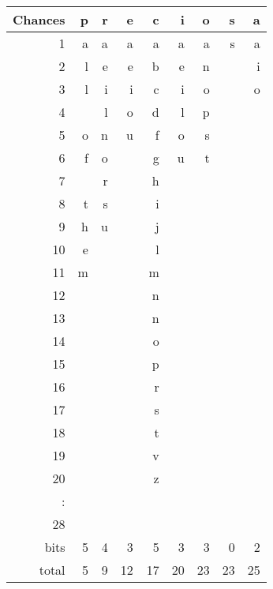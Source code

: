 \begin{tabular}{r|rrrrrrrr}
    Chances & p & r & e & c & i & o & s & a\\
    \hline
     1 & a & a & a & a & a & a & s & a\\
     2 & l & e & e & b & e & n &   & i\\
     3 & l & i & i & c & i & o &   & o\\
     4 &   & l & o & d & l & p &   &\\
     5 & o & n & u & f & o & s &   &\\
     6 & f & o &   & g & u & t &   &\\
     7 &   & r &   & h &   &   &   &\\
     8 & t & s &   & i &   &   &   &\\
     9 & h & u &   & j &   &   &   &\\
    10 & e &   &   & l &   &   &   &\\
    11 & m &   &   & m &   &   &   &\\
    12 &   &   &   & n &   &   &   &\\
    13 &   &   &   & ~n &   &   &   &\\
    14 &   &   &   & o &   &   &   &\\
    15 &   &   &   & p &   &   &   &\\
    16 &   &   &   & r &   &   &   &\\
    17 &   &   &   & s &   &   &   &\\
    18 &   &   &   & t &   &   &   &\\
    19 &   &   &   & v &   &   &   &\\
    20 &   &   &   & z &   &   &   &\\
     : &   &   &   &   &   &   &   &\\
    28 &   &   &   &   &   &   &   &\\
    \hline
     bits & 5 & 4 & 3 & 5 & 3 & 3 & 0 & 2\\
     total & 5 & 9 & 12 & 17 & 20 & 23 & 23 & 25
  \end{tabular}
